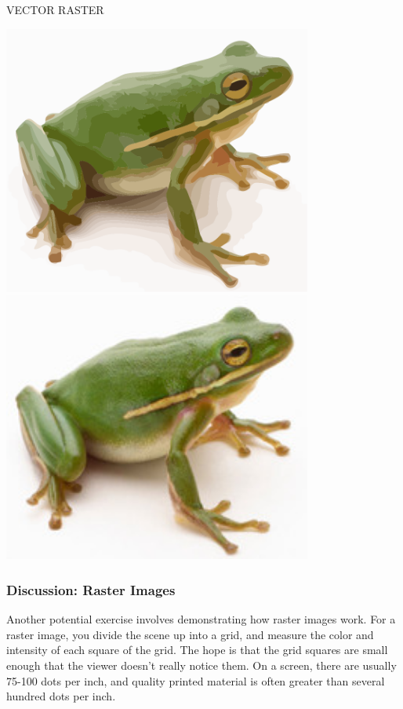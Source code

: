 \documentclass[11pt]{article}
\begin{document}
\begin{sideways}
\begin{minipage}{8.5in}
\begin{center}
VECTOR \hspace{4in} RASTER

\vspace{0.9in}
\includegraphics[width=4in]{frog.pdf}
\includegraphics[width=4in]{frog-reduced.jpg}
\end{center}
\end{minipage}
\end{sideways}
\newpage

\subsubsection{Discussion: Raster Images}

Another potential exercise involves demonstrating how raster images
work.  For a raster image, you divide the scene up into a grid, and
measure the color and intensity of each square of the grid.  The hope
is that the grid squares are small enough that the viewer doesn't
really notice them.  On a screen, there are usually 75-100 dots per
inch, and quality printed material is often greater than several
hundred dots per inch.
\end{document}
